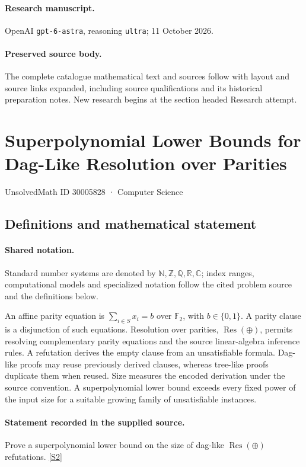 \documentclass[11pt]{article}
\begin{document}
\paragraph{Research manuscript.} OpenAI \texttt{gpt-6-astra}, reasoning \texttt{ultra}; 11 October 2026.
\paragraph{Preserved source body.} The complete catalogue mathematical text and sources follow with layout and source links expanded, including source qualifications and its historical preparation notes. New research begins at the section headed Research attempt.

\section{Superpolynomial Lower Bounds for Dag-Like Resolution over Parities}\label{30005828}
{\small UnsolvedMath ID 30005828 · Computer Science}
\subsection{Definitions and mathematical statement}

\paragraph{Shared notation.}Standard number systems are denoted by $\mathbb N,\mathbb Z,\mathbb Q,\mathbb R,\mathbb C$; index ranges, computational models and specialized notation follow the cited problem source and the definitions below.


An affine parity equation is $\sum_{i\in S}x_i=b$ over $\mathbb F_2$, with $b\in\{0,1\}$. A parity clause is a disjunction of such equations. Resolution over parities, $\operatorname{Res}(\oplus)$, permits resolving complementary parity equations and the source linear-algebra inference rules. A refutation derives the empty clause from an unsatisfiable formula. Dag-like proofs may reuse previously derived clauses, whereas tree-like proofs duplicate them when reused. Size measures the encoded derivation under the source convention. A superpolynomial lower bound exceeds every fixed power of the input size for a suitable growing family of unsatisfiable instances.
\paragraph{Statement recorded in the supplied source.}
Prove a superpolynomial lower bound on the size of dag-like $\operatorname{Res}(\oplus)$ refutations. \href{https://doi.org/10.4171/owr/2024/15}{[S2]}
\end{document}
